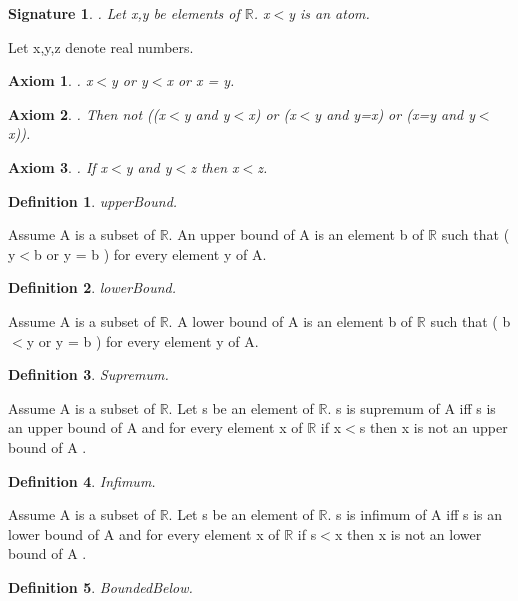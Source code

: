 \documentclass{article}
\newenvironment{forthel}{\begin{leftbar}}{\end{leftbar}}
\newtheorem{axiom}{Axiom}
\newtheorem{definition}{Definition}
\newtheorem{signature}{Signature}
\begin{document}
\begin{forthel}
\begin{signature}. Let x,y be elements of $\mathbb{R}$. x$<$y is an atom.

\end{signature}

Let x,y,z denote real numbers.

\begin{axiom}. x$<$y or y$<$x or x = y.

\end{axiom}

\begin{axiom}. Then not ((x$<$y and y$<$x) or (x$<$y and y=x) or (x=y and y$<$x)).

\end{axiom}
\begin{axiom}. If x$<$y and y$<$z then x$<$z.

\end{axiom}



\begin{definition} upperBound.

\end{definition}
Assume A is a subset of $\mathbb{R}$.
An upper bound of A is an element b of $\mathbb{R}$ such that ( y$<$b or y = b ) for every element y of A.

\begin{definition} lowerBound.

\end{definition}
Assume A is a subset of $\mathbb{R}$.
A lower bound of A is an element b of $\mathbb{R}$ such that ( b$<$y or y = b ) for every element y of A.

\begin{definition} Supremum.

\end{definition}
Assume A is a subset of $\mathbb{R}$.
Let s be an element of $\mathbb{R}$.
s is supremum of A  iff s is an upper bound of A 
and for every element x of $\mathbb{R}$ if x$<$s then x is not an upper bound of A .

\begin{definition} Infimum.

\end{definition}
Assume A is a subset of $\mathbb{R}$.
Let s be an element of $\mathbb{R}$.
s is infimum of A  iff s is an lower bound of A 
and for every element x of $\mathbb{R}$ if s$<$x then x is not an lower bound of A .

\begin{definition} BoundedBelow.


\end{definition}
\end{forthel}
\end{document}
